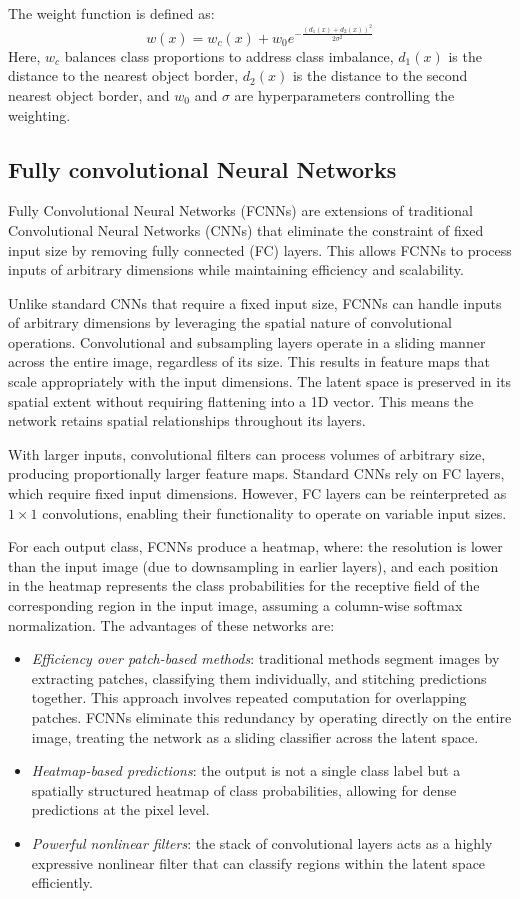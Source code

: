 The weight function is defined as: 
\[w(x)=w_c(x)+w_0e^{-\frac{(d_1(x)+d_2(x))^2}{2\sigma^2}}\]
Here, $w_c$ balances class proportions to address class imbalance, $d_1(x)$ is the distance to the nearest object border, $d_2(x)$ is the distance to the second nearest object border, and $w_0$ and $\sigma$ are hyperparameters controlling the weighting.


\subsection{Fully convolutional Neural Networks}
Fully Convolutional Neural Networks (FCNNs) are extensions of traditional Convolutional Neural Networks (CNNs) that eliminate the constraint of fixed input size by removing fully connected (FC) layers. 
This allows FCNNs to process inputs of arbitrary dimensions while maintaining efficiency and scalability.

Unlike standard CNNs that require a fixed input size, FCNNs can handle inputs of arbitrary dimensions by leveraging the spatial nature of convolutional operations.
Convolutional and subsampling layers operate in a sliding manner across the entire image, regardless of its size.
This results in feature maps that scale appropriately with the input dimensions.
The latent space is preserved in its spatial extent without requiring flattening into a 1D vector. 
This means the network retains spatial relationships throughout its layers.

With larger inputs, convolutional filters can process volumes of arbitrary size, producing proportionally larger feature maps.
Standard CNNs rely on FC layers, which require fixed input dimensions. However, FC layers can be reinterpreted as $1\times 1$ convolutions, enabling their functionality to operate on variable input sizes.

For each output class, FCNNs produce a heatmap, where: the resolution is lower than the input image (due to downsampling in earlier layers), and each position in the heatmap represents the class probabilities for the receptive field of the corresponding region in the input image, assuming a column-wise softmax normalization.
The advantages of these networks are: 
\begin{itemize}
    \item \textit{Efficiency over patch-based methods}: traditional methods segment images by extracting patches, classifying them individually, and stitching predictions together. 
        This approach involves repeated computation for overlapping patches.    
        FCNNs eliminate this redundancy by operating directly on the entire image, treating the network as a sliding classifier across the latent space.
    \item \textit{Heatmap-based predictions}: the output is not a single class label but a spatially structured heatmap of class probabilities, allowing for dense predictions at the pixel level.
    \item \textit{Powerful nonlinear filters}: the stack of convolutional layers acts as a highly expressive nonlinear filter that can classify regions within the latent space efficiently.
\end{itemize}

